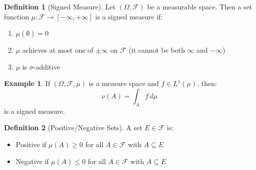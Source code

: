 \documentclass[11pt,a4paper]{article}
\theoremstyle{definition}
\newtheorem{definition}{Definition}[section]
\newtheorem{example}{Example}[section]
\begin{document}
\begin{definition}[Signed Measure]
Let $(\Omega, \mathcal{F})$ be a measurable space. Then a set function $\mu : \mathcal{F} \to [-\infty, +\infty]$ is a signed measure if:
\begin{enumerate}
\item $\mu(\emptyset) = 0$
\item $\mu$ achieves at most one of $\pm\infty$ on $\mathcal{F}$ (it cannot be both $\infty$ and $-\infty$)
\item $\mu$ is $\sigma$-additive
\end{enumerate}
\end{definition}

\begin{example}
If $(\Omega, \mathcal{F}, \mu)$ is a measure space and $f \in L^1(\mu)$, then:
\[\nu(A) = \int_A f \, d\mu\]
is a signed measure.
\end{example}

\begin{definition}[Positive/Negative Sets]
A set $E \in \mathcal{F}$ is:
\begin{itemize}
\item Positive if $\mu(A) \geq 0$ for all $A \in \mathcal{F}$ with $A \subseteq E$
\item Negative if $\mu(A) \leq 0$ for all $A \in \mathcal{F}$ with $A \subseteq E$
\end{itemize}
\end{definition}
\end{document}
